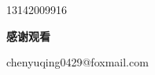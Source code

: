 \thispagestyle{empty}
\begin{flushleft}
   \vspace*{3.5cm}

   {13142009916}

   \vspace{1.5cm}
   \textbf{\Huge{\color{myred}感谢观看}}
        
   \vspace{1cm}

   {chenyuqing0429@foxmail.com}

   \vfill
        
\end{flushleft}
